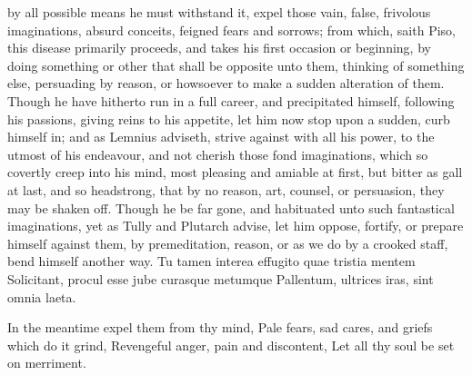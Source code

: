 {by all possible means he must withstand it, expel those vain,
false, frivolous imaginations, absurd conceits, feigned fears and
sorrows; from which, saith Piso, this disease primarily proceeds, and
takes his first occasion or beginning, by doing something or other that
shall be opposite unto them, thinking of something else, persuading by
reason, or howsoever to make a sudden alteration of them. Though he
have hitherto run in a full career, and precipitated himself, following
his passions, giving reins to his appetite, let him now stop upon a
sudden, curb himself in; and as Lemnius adviseth, strive against
with all his power, to the utmost of his endeavour, and not cherish
those fond imaginations, which so covertly creep into his mind, most
pleasing and amiable at first, but bitter as gall at last, and so
headstrong, that by no reason, art, counsel, or persuasion, they may be
shaken off. Though he be far gone, and habituated unto such fantastical
imaginations, yet as Tully and Plutarch advise, let him oppose,
fortify, or prepare himself against them, by premeditation, reason, or
as we do by a crooked staff, bend himself another way.
Tu tamen interea effugito quae tristia mentem
Solicitant, procul esse jube curasque metumque
Pallentum, ultrices iras, sint omnia laeta.

In the meantime expel them from thy mind,
Pale fears, sad cares, and griefs which do it grind,
Revengeful anger, pain and discontent,
Let all thy soul be set on merriment.

}
